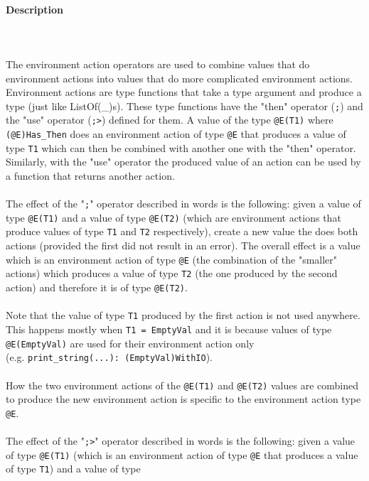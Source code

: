 \documentclass{article}
\begin{document}
\paragraph{Description}
\mbox{} \\\\
The environment action operators are used to combine values that do environment
actions into values that do more complicated environment actions. Environment
actions are type functions that take a type argument and produce a type (just
like ListOf(_)s). These type functions have the "then" operator (\verb|;|)
and the "use" operator (\verb|;>|) defined for them.  A value of the type
\verb|@E(T1)| where \verb|(@E)Has_Then| does an environment action of type
\verb|@E| that produces a value of type \verb|T1| which can then be
combined with another one with the "then" operator. Similarly, with the "use"
operator the produced value of an action can be used by a function that returns
another action.
\\\\
The effect of the "\verb|;|" operator described in words is the following:
given a value of type \verb|@E(T1)| and a value of type \verb|@E(T2)|
(which are environment actions that produce values of type \verb|T1| and
\verb|T2| respectively), create a new value the does both actions (provided
the first did not result in an error).  The overall effect is a value which is
an environment action of type \verb|@E| (the combination of the "smaller"
actions) which produces a value of type \verb|T2| (the one produced by the
second action) and therefore it is of type \verb|@E(T2)|.
\\\\
Note that the value of type \verb|T1| produced by the first action is not
used anywhere. This happens mostly when \verb|T1 = EmptyVal| and it is
because values of type \verb|@E(EmptyVal)| are used for their environment
action only \\(e.g. \verb|print_string(...): (EmptyVal)WithIO|).
\\\\
How the two environment actions of the \verb|@E(T1)| and \verb|@E(T2)|
values are combined to produce the new environment action is specific to the
environment action type \verb|@E|.
\\\\
The effect of the "\verb|;>|" operator described in words is the following:
given a value of type \verb|@E(T1)| (which is an environment action of type
\verb|@E| that produces a value of type \verb|T1|) and a value of type
\end{document}
